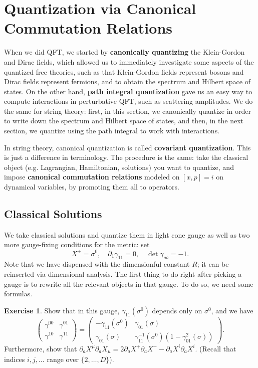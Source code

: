 \documentclass{report}
\theoremstyle{plain}
\theoremstyle{definition}
\newtheorem{exercise}{Exercise}[section]
\theoremstyle{remark}
\newcommand{\di}{\partial}
\begin{document}
\section{Quantization via Canonical Commutation Relations}

When we did QFT, we started by {\bf canonically quantizing} the
Klein-Gordon and Dirac fields, which allowed us to immediately
investigate some aspects of the quantized free theories, such as that
Klein-Gordon fields represent bosons and Dirac fields represent
fermions, and to obtain the spectrum and Hilbert space of states. On
the other hand, {\bf path integral quantization} gave us an easy way
to compute interactions in perturbative QFT, such as scattering
amplitudes. We do the same for string theory: first, in this section,
we canonically quantize in order to write down the spectrum and
Hilbert space of states, and then, in the next section, we quantize
using the path integral to work with interactions.

In string theory, canonical quantization is called {\bf covariant
  quantization}. This is just a difference in terminology. The
procedure is the same: take the classical object (e.g. Lagrangian,
Hamiltonian, solutions) you want to quantize, and impose {\bf
  canonical commutation relations} modeled on $[x, p] = i$ on
dynamical variables, by promoting them all to operators.

\subsection{Classical Solutions}

We take classical solutions and quantize them in light cone gauge as
well as two more gauge-fixing conditions for the metric: set
\[ X^+ = \sigma^0, \quad \di_1 \gamma_{11} = 0, \quad \det \gamma_{ab} = -1. \]
Note that we have dispensed with the dimensionful constant $R$; it can
be reinserted via dimensional analysis. The first thing to do right
after picking a gauge is to rewrite all the relevant objects in that
gauge. To do so, we need some formulas.

\begin{exercise}
  Show that in this gauge, $\gamma_{11}(\sigma^0)$ depends only on
  $\sigma^0$, and we have
  \[ \begin{pmatrix} \gamma^{00} & \gamma^{01} \\ \gamma^{10} & \gamma^{11} \end{pmatrix} = \begin{pmatrix} -\gamma_{11}(\sigma^0) & \gamma_{01}(\sigma) \\ \gamma_{01}(\sigma) & \gamma_{11}^{-1}(\sigma^0)(1 - \gamma_{01}^2(\sigma)) \end{pmatrix}. \]
  Furthermore, show that $\di_a X^\mu \di_a X_\mu = 2\di_a X^+ \di_a
  X^- - \di_a X^i \di_a X^i$. (Recall that indices $i, j, \ldots$
  range over $\{2, \ldots, D\}$).
\end{exercise}
\end{document}
